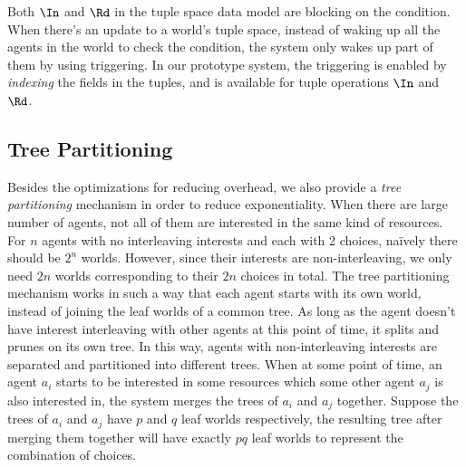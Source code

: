 Both $\In$ and $\Rd$ in the tuple space data model are blocking on the condition. 
When there's an update to a world's tuple space, instead of waking up all the agents 
in the world to check the condition, the system only wakes up part of them by using triggering. 
In our prototype system, the triggering is enabled by \emph{indexing} 
the fields in the tuples, and is available for tuple operations $\In$ and $\Rd$.

\subsection*{Tree Partitioning}

Besides the optimizations for reducing overhead, we also provide a 
{\em tree partitioning} mechanism in order to reduce exponentiality. 
When there are large number of agents, not all of them are interested in 
the same kind of resources. For $n$ agents with no interleaving interests 
and each with 2 choices, na\"ively there should be $2^n$ worlds. 
However, since their interests are non-interleaving, we only 
need $2n$ worlds corresponding to their $2n$ choices in total. 
The tree partitioning mechanism works in such a way that 
each agent starts with its own world, instead of joining the leaf worlds 
of a common tree. As long as the agent doesn't have interest interleaving 
with other agents at this point of time, it splits and prunes on its own tree. 
In this way, agents with non-interleaving interests are separated 
and partitioned into different trees. 
When at some point of time, an agent $a_i$ starts to be interested in some 
resources which some other agent $a_j$ is also interested in, 
the system merges the trees of $a_i$ and $a_j$ together. 
Suppose the trees of $a_i$ and $a_j$ have $p$ and $q$ leaf worlds respectively,
the resulting tree after merging them together will have exactly $pq$ leaf worlds 
to represent the combination of choices. 


